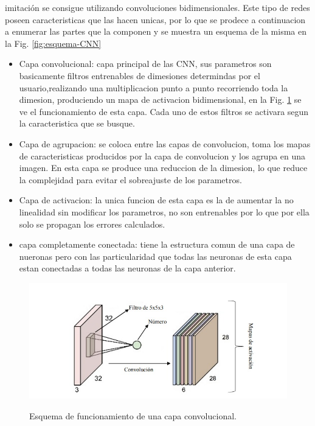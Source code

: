 imitación se consigue utilizando convoluciones bidimensionales. Este tipo de redes poseen caracteristicas que las hacen unicas, por lo que
se prodece a continuacion a enumerar las partes que la componen y se muestra un esquema de la misma en la Fig. \ref*{fig:esquema-CNN}
\begin{itemize}
    \item Capa convolucional: capa principal de las CNN, sus parametros son basicamente filtros entrenables de dimesiones determindas por el
          usuario,realizando una multiplicacion punto a punto recorriendo toda la dimesion, produciendo un mapa de activacion bidimensional, en la
          Fig. \ref{fig:esquema-capa-convolucional} se ve el funcionamiento de esta capa. Cada uno de estos filtros se activara segun la
          caracteristica que se busque.
    \item Capa de agrupacion: se coloca entre las capas de convolucion, toma los mapas de caracteristicas producidos por la capa de
          convolucion y los agrupa en una imagen. En esta capa se produce una reduccion de la dimesion, lo que reduce la complejidad para evitar el sobreajuste de los parametros.
    \item Capa de activacion: la unica funcion de esta capa es la de aumentar la no linealidad sin modificar los parametros, no son entrenables
          por lo que por ella solo se propagan los errores calculados.
    \item capa completamente conectada: tiene la estructura comun de una capa de nueronas pero con las particularidad que todas las neuronas
          de esta capa estan conectadas a todas las neuronas de la capa anterior.
\end{itemize}
\begin{figure}
    \centering
    \includegraphics[width=1\textwidth]{imgs/capa-convolucional.jpeg}
    \label{fig:esquema-capa-convolucional}
    \caption{Esquema de funcionamiento de una capa convolucional.}
\end{figure}
